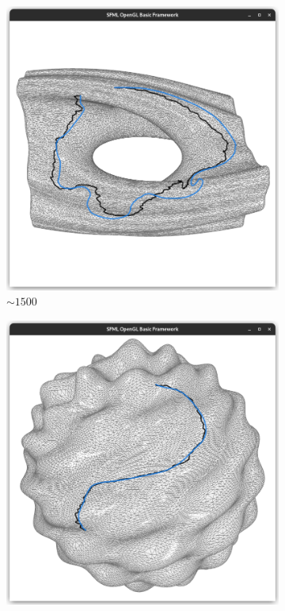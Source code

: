 \documentclass{stdlocal}
\begin{document}
\begin{figure}
  \begin{subfigure}[b]{0.24\linewidth}
    \centering
    \includegraphics[width=\linewidth,trim={25px 20 25 50},clip]{images/julia-smooth-1.png}
    \caption{$\sim 1500$}
  \end{subfigure}
  \begin{subfigure}[b]{0.24\linewidth}
    \centering
    \includegraphics[width=\linewidth,trim={25px 20 25 50},clip]{images/harmonic-smooth-1.png}

\end{subfigure}
\end{figure}
\end{document}
